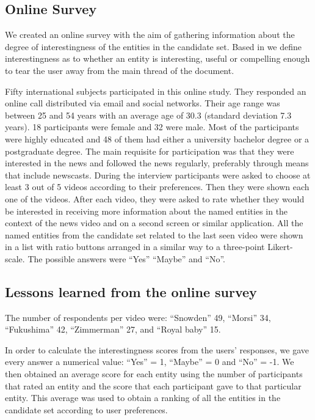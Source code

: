 \documentclass{llncs}
\begin{document}
\subsection{Online Survey}
We created an online survey with the aim of gathering information about the degree of interestingness of the entities in the candidate set. Based in \cite{vonBrzeski:2007:LCU:1321440.1321537} we define interestingness as to whether an entity is interesting, useful or compelling enough to tear the user away from the main thread of the document. 

Fifty international subjects participated in this online study. They responded an online call distributed via email and social networks. Their age range was between 25 and 54 years with an average age of 30.3 (standard deviation 7.3 years). 18 participants were female and 32 were male. Most of the participants were highly educated and 48 of them had either a university bachelor degree or a postgraduate degree. The main requisite for participation was that they were interested in the news and followed the news regularly, preferably through means that include newscasts.
During the interview participants were asked to choose at least 3 out of 5 videos according to their preferences. Then they were shown each one of the videos. After each video, they were asked to rate whether they would be interested in receiving more information about the named entities in the context of the news video and on a second screen or similar application. All the named entities from the candidate set related to the last seen video were shown in a list with ratio buttons arranged in a similar way to a three-point Likert-scale. The possible answers were ``Yes'' ``Maybe'' and ``No''. 

\subsection{Lessons learned from the online survey}
\label{sec:LessonsLearned}

The number of respondents per video were: ``Snowden'' 49, ``Morsi'' 34, ``Fukushima'' 42, ``Zimmerman'' 27, and ``Royal baby'' 15.

In order to calculate the interestingness scores from the users’ responses, we gave every answer a numerical value: ``Yes'' = 1, ``Maybe'' = 0 and ``No'' = -1.  We then obtained an average score for each entity using the number of participants that rated an entity and the score that each participant gave to that particular entity.  This average was used to obtain a ranking of all the entities in the candidate set according to user preferences. 
\end{document}
